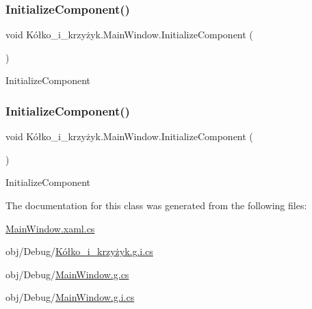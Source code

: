 \mbox{\label{class_k_xC3_xB3_xC5_x82ko__i__krzy_xC5_xBCyk_1_1_main_window_a6e1ed799456bf3fe5b1be74d7ae956b3}} 
\subsubsection{\texorpdfstring{Initialize\+Component()}{InitializeComponent()}\hspace{0.1cm}{\footnotesize\ttfamily [2/3]}}
{\footnotesize\ttfamily void Kółko\+\_\+i\+\_\+krzyżyk.\+Main\+Window.\+Initialize\+Component (\begin{DoxyParamCaption}{ }\end{DoxyParamCaption})}



Initialize\+Component 

\mbox{\label{class_k_xC3_xB3_xC5_x82ko__i__krzy_xC5_xBCyk_1_1_main_window_a6e1ed799456bf3fe5b1be74d7ae956b3}} 
\subsubsection{\texorpdfstring{Initialize\+Component()}{InitializeComponent()}\hspace{0.1cm}{\footnotesize\ttfamily [3/3]}}
{\footnotesize\ttfamily void Kółko\+\_\+i\+\_\+krzyżyk.\+Main\+Window.\+Initialize\+Component (\begin{DoxyParamCaption}{ }\end{DoxyParamCaption})}



Initialize\+Component 



The documentation for this class was generated from the following files\+:\begin{DoxyCompactItemize}
\item 
\hyperlink{_main_window_8xaml_8cs}{Main\+Window.\+xaml.\+cs}\item 
obj/\+Debug/\hyperlink{_k_xC3_xB3_xC5_x82ko__i__krzy_xC5_xBCyk_8g_8i_8cs}{Kółko\+\_\+i\+\_\+krzyżyk.\+g.\+i.\+cs}\item 
obj/\+Debug/\hyperlink{_main_window_8g_8cs}{Main\+Window.\+g.\+cs}\item 
obj/\+Debug/\hyperlink{_main_window_8g_8i_8cs}{Main\+Window.\+g.\+i.\+cs}\end{DoxyCompactItemize}
